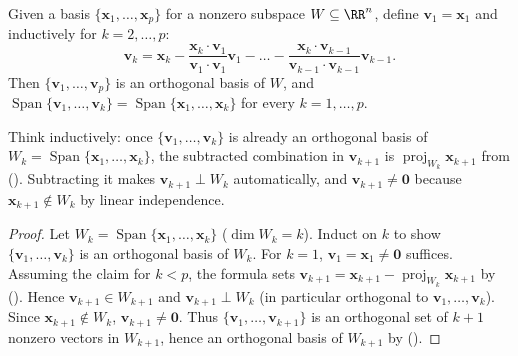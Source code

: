 \documentclass[10pt]{scrartcl}
\newcommand{\vv}[1]{\mathbf{#1}}
\DeclareMathOperator{\spn}{Span}\DeclareMathOperator{\Nul}{Nul}\DeclareMathOperator{\Col}{Col}\DeclareMathOperator{\Row}{Row}\DeclareMathOperator{\tr}{tr}\DeclareMathOperator{\proj}{proj}\DeclareMathOperator{\dist}{dist}
\begin{document}
\begin{theorem*}
  Given a basis $\{\vv x_1,\dots,\vv x_p\}$ for a nonzero subspace $W\subseteq\RR^n$, define $\vv v_1=\vv x_1$ and inductively for $k=2,\dots,p$:
  \[
    \vv v_k = \vv x_k - \frac{\vv x_k\cdot\vv v_1}{\vv v_1\cdot\vv v_1}\vv v_1 - \dots - \frac{\vv x_k\cdot\vv v_{k-1}}{\vv v_{k-1}\cdot\vv v_{k-1}}\vv v_{k-1}.
  \]
  Then $\{\vv v_1,\dots,\vv v_p\}$ is an orthogonal basis of $W$, and $\spn\{\vv v_1,\dots,\vv v_k\}=\spn\{\vv x_1,\dots,\vv x_k\}$ for every $k=1,\dots,p$.
\end{theorem*}
\begin{ideabox}
  Think inductively: once $\{\vv v_1,\dots,\vv v_k\}$ is already an orthogonal basis of $W_k=\spn\{\vv x_1,\dots,\vv x_k\}$, the subtracted combination in $\vv v_{k+1}$ is $\proj_{W_k}\vv x_{k+1}$ from (). Subtracting it makes $\vv v_{k+1}\perp W_k$ automatically, and $\vv v_{k+1}\ne\vv 0$ because $\vv x_{k+1}\notin W_k$ by linear independence.
\end{ideabox}
\begin{proof}
  Let $W_k=\spn\{\vv x_1,\dots,\vv x_k\}$ ($\dim W_k=k$). Induct on $k$ to show $\{\vv v_1,\dots,\vv v_k\}$ is an orthogonal basis of $W_k$. For $k=1$, $\vv v_1=\vv x_1\ne\vv 0$ suffices. Assuming the claim for $k<p$, the formula sets $\vv v_{k+1}=\vv x_{k+1}-\proj_{W_k}\vv x_{k+1}$ by (). Hence $\vv v_{k+1}\in W_{k+1}$ and $\vv v_{k+1}\perp W_k$ (in particular orthogonal to $\vv v_1,\dots,\vv v_k$). Since $\vv x_{k+1}\notin W_k$, $\vv v_{k+1}\ne\vv 0$. Thus $\{\vv v_1,\dots,\vv v_{k+1}\}$ is an orthogonal set of $k+1$ nonzero vectors in $W_{k+1}$, hence an orthogonal basis of $W_{k+1}$ by ().
\end{proof}
\end{document}
